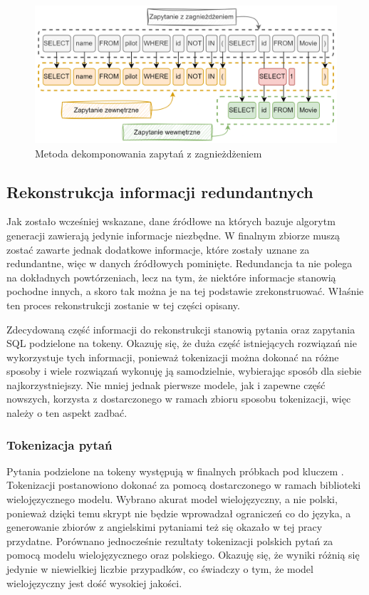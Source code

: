 \begin{figure}[ht!]
  \centering
  \includegraphics[width=1.0\linewidth]{images/query_decomposition_nested.png}
  \caption{Metoda dekomponowania zapytań z zagnieżdżeniem}
  \label{fig:query-decomposition-nested}
\end{figure}

\subsection{Rekonstrukcja informacji redundantnych}
Jak zostało wcześniej wskazane, dane źródłowe na których bazuje algorytm generacji zawierają jedynie informacje niezbędne. W finalnym zbiorze muszą zostać zawarte jednak dodatkowe informacje, które zostały uznane za redundantne, więc w danych źródłowych pominięte. Redundancja ta nie polega na dokładnych powtórzeniach, lecz na tym, że niektóre informacje stanowią pochodne innych, a skoro tak można je na tej podstawie zrekonstruować. Właśnie ten proces rekonstrukcji zostanie w tej części opisany.

Zdecydowaną część informacji do rekonstrukcji stanowią pytania oraz zapytania SQL podzielone na tokeny. Okazuję się, że duża część istniejących rozwiązań nie wykorzystuje tych informacji, ponieważ tokenizacji można dokonać na różne sposoby i wiele rozwiązań wykonuję ją samodzielnie, wybierając sposób dla siebie najkorzystniejszy. Nie mniej jednak pierwsze modele, jak i zapewne część nowszych, korzysta z dostarczonego w ramach zbioru sposobu tokenizacji, więc należy o ten aspekt zadbać.

\subsubsection{Tokenizacja pytań}
Pytania podzielone na tokeny występują w finalnych próbkach pod kluczem . Tokenizacji postanowiono dokonać za pomocą dostarczonego w ramach biblioteki  wielojęzycznego modelu. Wybrano akurat model wielojęzyczny, a nie polski, ponieważ dzięki temu skrypt nie będzie wprowadzał ograniczeń co do języka, a generowanie zbiorów z angielskimi pytaniami też się okazało w tej pracy przydatne. Porównano jednocześnie rezultaty tokenizacji polskich pytań za pomocą modelu wielojęzycznego oraz polskiego. Okazuję się, że wyniki różnią się jedynie w niewielkiej liczbie przypadków, co świadczy o tym, że model wielojęzyczny jest dość wysokiej jakości.

